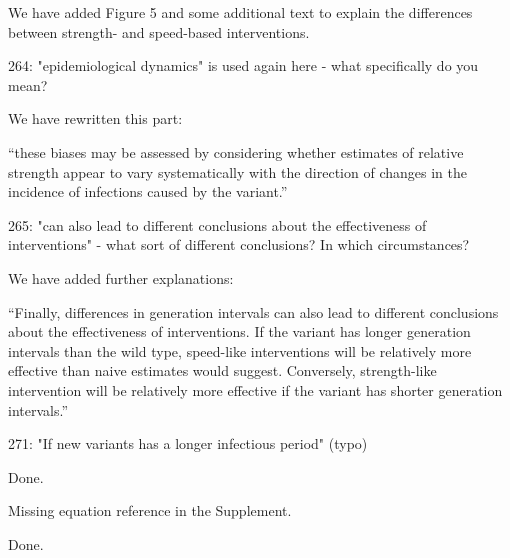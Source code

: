 \documentclass[12pt]{article}
\newcommand{\revtext}{\textsf}
\begin{document}
We have added Figure 5 and some additional text to explain the differences between strength- and speed-based interventions.

\revtext{264: "epidemiological dynamics" is used again here - what specifically do you mean?}

We have rewritten this part:

``these biases may be assessed by considering whether estimates of relative strength appear to vary systematically with the direction of changes in the incidence of infections caused by the variant.''

\revtext{265: "can also lead to different conclusions about the effectiveness of interventions" - what sort of different conclusions? In which circumstances?}

We have added further explanations:

``Finally, differences in generation intervals can also lead to different conclusions about the effectiveness of interventions.
If the variant has longer generation intervals than the wild type, speed-like interventions will be relatively more effective than naive estimates would suggest. 
Conversely, strength-like intervention will be relatively more effective if the variant has shorter generation intervals.''

\revtext{271: "If new variants has a longer infectious period" (typo)}

Done.

\revtext{Missing equation reference in the Supplement.}

Done.


\end{document}
